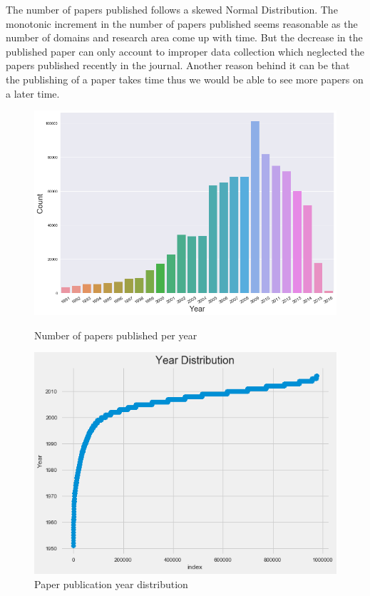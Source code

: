 \documentclass[a4paper, 11pt]{article}
\begin{document}
The number of papers published follows a skewed Normal Distribution. The monotonic increment in the number of papers published seems reasonable as the number of domains and research area come up with time. But the decrease in the published paper can only account to improper data collection which neglected the papers published recently in the journal. Another reason behind it can be that the publishing of a paper takes time thus we would be able to see more papers on a later time.

\begin{figure}[ht]
    \centering
    \begin{minipage}{0.45\textwidth}
        \centering
        \includegraphics[width=1.2\textwidth]{year-distribution.png}
        \caption{Number of papers published per year}
    \end{minipage}\hfill
    \begin{minipage}{0.45\textwidth}
        \centering
        \includegraphics[width=.9\textwidth]{year_graph.png}
        \caption{Paper publication year distribution}
    \end{minipage}
\end{figure}
\end{document}
